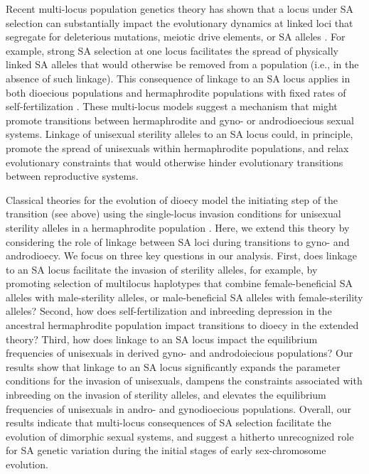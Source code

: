 \documentclass{article}
\begin{document}
Recent multi-locus population genetics theory has shown that a locus under SA selection can substantially impact the evolutionary dynamics at linked loci that segregate for deleterious mutations, meiotic drive elements, or SA alleles \citep{ConnallonClark2010, Patten2010, UbedaPatten2010, ConnallonJordan2016, Olito2016}. For example, strong SA selection at one locus facilitates the spread of physically linked SA alleles that would otherwise be removed from a population (i.e., in the absence of such linkage). This consequence of linkage to an SA locus applies in both dioecious populations \citep{Patten2010,ConnallonClark2010} and hermaphrodite populations with fixed rates of self-fertilization \citep{Olito2016}. These multi-locus models suggest a mechanism that might promote transitions between hermaphrodite and gyno- or androdioecious sexual systems. Linkage of unisexual sterility alleles to an SA locus could, in principle, promote the spread of unisexuals within hermaphrodite populations, and relax evolutionary constraints that would otherwise hinder evolutionary transitions between reproductive systems.

Classical theories for the evolution of dioecy model the initiating step of the transition (see above) using the single-locus invasion conditions for unisexual sterility alleles in a hermaphrodite population \citep{Charlesworth1978a}. Here, we extend this theory by considering the role of linkage between SA loci during transitions to gyno- and androdioecy. We focus on three key questions in our analysis. First, does linkage to an SA locus facilitate the invasion of sterility alleles, for example, by promoting selection of multilocus haplotypes that combine female-beneficial SA alleles with male-sterility alleles, or male-beneficial SA alleles with female-sterility alleles? Second, how does self-fertilization and inbreeding depression in the ancestral hermaphrodite population impact transitions to dioecy in the extended theory? Third, how does linkage to an SA locus impact the equilibrium frequencies of unisexuals in derived gyno- and androdoiecious populations? Our results show that linkage to an SA locus significantly expands the parameter conditions for the invasion of unisexuals, dampens the constraints associated with inbreeding on the invasion of sterility alleles, and elevates the equilibrium frequencies of unisexuals in andro- and gynodioecious populations. Overall, our results indicate that multi-locus consequences of SA selection facilitate the evolution of dimorphic sexual systems, and suggest a hitherto unrecognized role for SA genetic variation during the initial stages of early sex-chromosome evolution.
\end{document}
